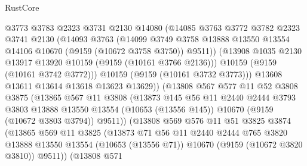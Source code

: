 \begin{lexlean}{RustCore}
\begin{coremodule}
                    @3773
                    @3783
                    @2323
                    @3731
                    @2130
                    @14080
                    (@14085
                      @3763
                      @3772
                      @3782
                      @2323
                      @3741
                      @2130
                      (@14093
                        @3763
                        (@14099
                          @3749
                          @3758
                          @13888
                          @13550
                          @13554
                          @14106
                          @10670
                          (@9159 (@10672 @3758 @3750))
                          @9511))
                      (@13908 @1035 @2130 @13917 @13920 @10159 (@9159 (@10161 @3766 @2136)))
                      @10159
                      (@9159 (@10161 @3742 @3772)))
                    @10159
                    (@9159 (@10161 @3732 @3773)))
                  @13608
                  @13611
                  @13614
                  @13618
                  @13623
                  @13629))
              (@13808
                @567
                @577
                @11
                @52
                @3808
                @3875
                (@13865
                  @567
                  @11
                  @3808
                  (@13873
                    @145
                    @56
                    @11
                    @2440
                    @2444
                    @3793
                    @3803
                    @13888
                    @13550
                    @13554
                    (@10653 (@13556 @145))
                    @10670
                    (@9159 (@10672 @3803 @3794))
                    @9511))
                (@13808
                  @569
                  @576
                  @11
                  @51
                  @3825
                  @3874
                  (@13865
                    @569
                    @11
                    @3825
                    (@13873
                      @71
                      @56
                      @11
                      @2440
                      @2444
                      @765
                      @3820
                      @13888
                      @13550
                      @13554
                      (@10653 (@13556 @71))
                      @10670
                      (@9159 (@10672 @3820 @3810))
                      @9511))
                  (@13808
                    @571

\end{coremodule}
\end{lexlean}
